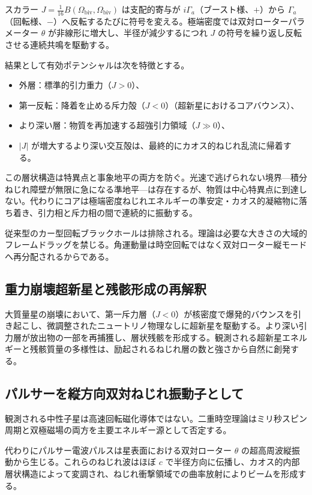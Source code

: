 \documentclass[dvipdfmx,a4paper]{article}
\begin{document}
スカラー $J = \frac{1}{16} B(\Omega_\text{biv}, \Omega_\text{biv})$ は支配的寄与が $i\Gamma_a$（ブースト様、$+$）から $\Gamma_a$（回転様、$-$）へ反転するたびに符号を変える。極端密度では双対ローターパラメーター $\theta$ が非線形に増大し、半径が減少するにつれ $J$ の符号を繰り返し反転させる連続共鳴を駆動する。

結果として有効ポテンシャルは次を特徴とする。
\begin{itemize}
\item 外層：標準的引力重力（$J > 0$）、
\item 第一反転：降着を止める斥力殻（$J < 0$）（超新星におけるコアバウンス）、
\item より深い層：物質を再加速する超強引力領域（$J \gg 0$）、
\item $|J|$ が増大するより深い交互殻は、最終的にカオス的ねじれ乱流に帰着する。
\end{itemize}

この層状構造は特異点と事象地平の両方を防ぐ。光速で逃げられない境界---積分ねじれ障壁が無限に急になる準地平---は存在するが、物質は中心特異点に到達しない。代わりにコアは極端密度ねじれエネルギーの準安定・カオス的凝縮物に落ち着き、引力相と斥力相の間で連続的に振動する。

従来型のカー型回転ブラックホールは排除される。理論は必要な大きさの大域的フレームドラッグを禁じる。角運動量は時空回転ではなく双対ローター縦モードへ再分配されるからである。

\subsection{重力崩壊超新星と残骸形成の再解釈}

大質量星の崩壊において、第一斥力層（$J < 0$）が核密度で爆発的バウンスを引き起こし、微調整されたニュートリノ物理なしに超新星を駆動する。より深い引力層が放出物の一部を再捕獲し、層状残骸を形成する。観測される超新星エネルギーと残骸質量の多様性は、励起されるねじれ層の数と強さから自然に創発する。

\subsection{パルサーを縦方向双対ねじれ振動子として}

観測される中性子星は高速回転磁化導体ではない。二重時空理論はミリ秒スピン周期と双極磁場の両方を主要エネルギー源として否定する。

代わりにパルサー電波パルスは星表面における双対ローター $\theta$ の超高周波縦振動から生じる。これらのねじれ波はほぼ $c$ で半径方向に伝播し、カオス的内部層状構造によって変調され、ねじれ衝撃領域での曲率放射によりビームを形成する。
\end{document}
